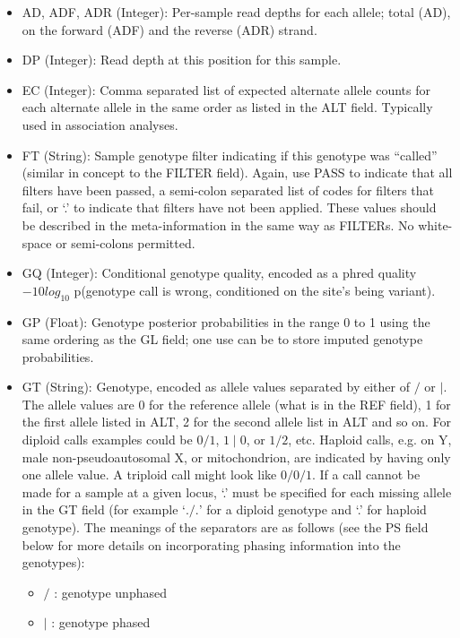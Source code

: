 \documentclass[8pt]{article}
\begin{document}
\begin{itemize}
\renewcommand{\labelitemii}{$\circ$}
  \item AD, ADF, ADR (Integer): Per-sample read depths for each allele; total (AD), on the forward (ADF) and the reverse (ADR) strand.
  \item DP (Integer): Read depth at this position for this sample.
  \item EC (Integer): Comma separated list of expected alternate allele counts for each alternate allele in the same order as listed in the ALT field. Typically used in association analyses.
  \item FT (String): Sample genotype filter indicating if this genotype was ``called'' (similar in concept to the FILTER field). Again, use PASS to indicate that all filters have been passed, a semi-colon separated list of codes for filters that fail, or `.' to indicate that filters have not been applied. These values should be described in the meta-information in the same way as FILTERs. No white-space or semi-colons permitted.
  \item GQ (Integer): Conditional genotype quality, encoded as a phred quality $-10log_{10}$ p(genotype call is wrong, conditioned on the site's being variant).
  \item GP (Float): Genotype posterior probabilities in the range 0 to 1 using the same ordering as the GL field; one use can be to store imputed genotype probabilities.
  \item GT (String): Genotype, encoded as allele values separated by either of $/$ or $\mid$. The allele values are 0 for the reference allele (what is in the REF field), 1 for the first allele listed in ALT, 2 for the second allele list in ALT and so on. For diploid calls examples could be $0/1$, $1\mid0$, or $1/2$, etc. Haploid calls, e.g. on Y, male non-pseudoautosomal X, or mitochondrion, are indicated by having only one allele value. A triploid call might look like $0/0/1$. If a call cannot be made for a sample at a given locus, `.' must be specified for each missing allele in the GT field (for example `$./.$' for a diploid genotype and `.' for haploid genotype). The meanings of the separators are as follows (see the PS field below for more details on incorporating phasing information into the genotypes):
	\begin{itemize}
	  \item $/$ : genotype unphased
	  \item $\mid$ : genotype phased
	\end{itemize}


\end{itemize}
\end{document}
